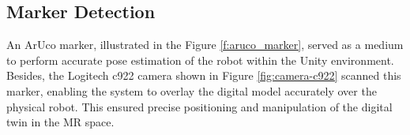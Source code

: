 
\subsection{Marker Detection}

An ArUco marker, illustrated in the Figure \ref{f:aruco_marker}, served as a medium to perform accurate pose estimation of the robot within the Unity environment. Besides, the Logitech c922 camera shown in Figure \ref{fig:camera-c922} scanned this marker, enabling the system to overlay the digital model accurately over the physical robot. This ensured precise positioning and manipulation of the digital twin in the \ac{MR} space.

